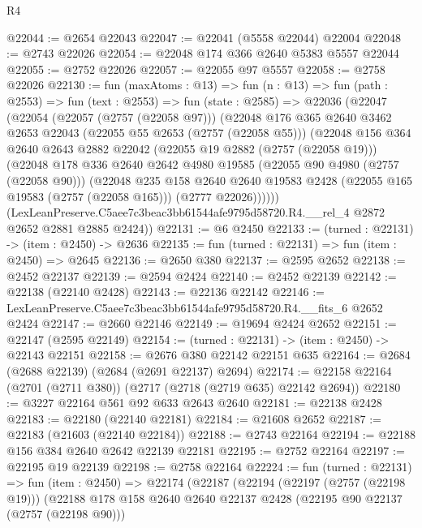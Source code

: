\begin{lexlean}{R4}
\begin{coremodule}
@22044 := @2654 @22043
@22047 := @22041 (@5558 @22044) @22004
@22048 := @2743 @22026
@22054 := @22048 @174 @366 @2640 @5383 @5557 @22044
@22055 := @2752 @22026
@22057 := @22055 @97 @5557
@22058 := @2758 @22026
@22130 := fun (maxAtoms : @13) =>
  fun (n : @13) =>
  fun (path : @2553) =>
  fun (text : @2553) =>
  fun (state : @2585) =>
  @22036
    (@22047
      (@22054
        (@22057 (@2757 (@22058 @97)))
        (@22048
          @176
          @365
          @2640
          @3462
          @2653
          @22043
          (@22055 @55 @2653 (@2757 (@22058 @55)))
          (@22048
            @156
            @364
            @2640
            @2643
            @2882
            @22042
            (@22055 @19 @2882 (@2757 (@22058 @19)))
            (@22048
              @178
              @336
              @2640
              @2642
              @4980
              @19585
              (@22055 @90 @4980 (@2757 (@22058 @90)))
              (@22048
                @235
                @158
                @2640
                @2640
                @19583
                @2428
                (@22055 @165 @19583 (@2757 (@22058 @165)))
                (@2777 @22026))))))
      (LexLeanPreserve.C5aee7c3beac3bb61544afe9795d58720.R4.__rel_4 @2872 @2652 @2881 @2885 @2424))
@22131 := @6 @2450
@22133 := (turned : @22131) -> (item : @2450) -> @2636
@22135 := fun (turned : @22131) => fun (item : @2450) => @2645
@22136 := @2650 @380
@22137 := @2595 @2652
@22138 := @2452 @22137
@22139 := @2594 @2424
@22140 := @2452 @22139
@22142 := @22138 (@22140 @2428)
@22143 := @22136 @22142
@22146 := LexLeanPreserve.C5aee7c3beac3bb61544afe9795d58720.R4.__fits_6 @2652 @2424
@22147 := @2660 @22146
@22149 := @19694 @2424 @2652
@22151 := @22147 (@2595 @22149)
@22154 := (turned : @22131) -> (item : @2450) -> @22143 @22151
@22158 := @2676 @380 @22142 @22151 @635
@22164 := @2684 (@2688 @22139) (@2684 (@2691 @22137) @2694)
@22174 := @22158 @22164 (@2701 (@2711 @380)) (@2717 (@2718 (@2719 @635) @22142 @2694))
@22180 := @3227 @22164 @561 @92 @633 @2643 @2640
@22181 := @22138 @2428
@22183 := @22180 (@22140 @22181)
@22184 := @21608 @2652
@22187 := @22183 (@21603 (@22140 @22184))
@22188 := @2743 @22164
@22194 := @22188 @156 @384 @2640 @2642 @22139 @22181
@22195 := @2752 @22164
@22197 := @22195 @19 @22139
@22198 := @2758 @22164
@22224 := fun (turned : @22131) =>
  fun (item : @2450) =>
  @22174
    (@22187
      (@22194
        (@22197 (@2757 (@22198 @19)))
        (@22188
          @178
          @158
          @2640
          @2640
          @22137
          @2428
          (@22195 @90 @22137 (@2757 (@22198 @90)))

\end{coremodule}
\end{lexlean}
